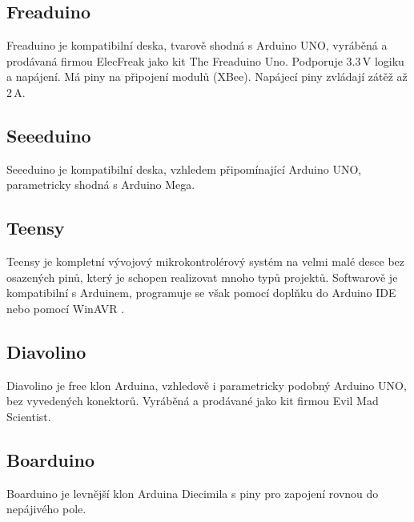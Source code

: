 	\subsection{Freaduino} 
	Freaduino je kompatibilní deska, tvarově shodná s Arduino UNO, vyráběná a prodávaná firmou ElecFreak jako kit The Freaduino Uno. Podporuje 3.3\,V logiku a napájení. Má piny na připojení modulů (XBee). Napájecí piny zvládají zátěž až 2\,A.
	
	\subsection{Seeeduino} 
	Seeeduino je kompatibilní deska, vzhledem připomínající Arduino UNO, parametricky shodná s Arduino Mega.
	
	\subsection{Teensy}
	Teensy je kompletní vývojový mikrokontrolérový systém na velmi malé desce bez osazených pinů, který je schopen realizovat mnoho typů projektů. Softwarově je kompatibilní s Arduinem, programuje se však pomocí doplňku do Arduino IDE nebo pomocí WinAVR \cite{ArduinoTeensy}.
	
	\subsection{Diavolino} 
	Diavolino je free klon Arduina, vzhledově i parametricky podobný Arduino UNO, bez vyvedených konektorů. Vyráběná a prodávané jako kit firmou Evil Mad Scientist.
	
	\subsection{Boarduino} 
	Boarduino je levnější klon Arduina Diecimila s piny pro zapojení rovnou do nepájivého pole.




